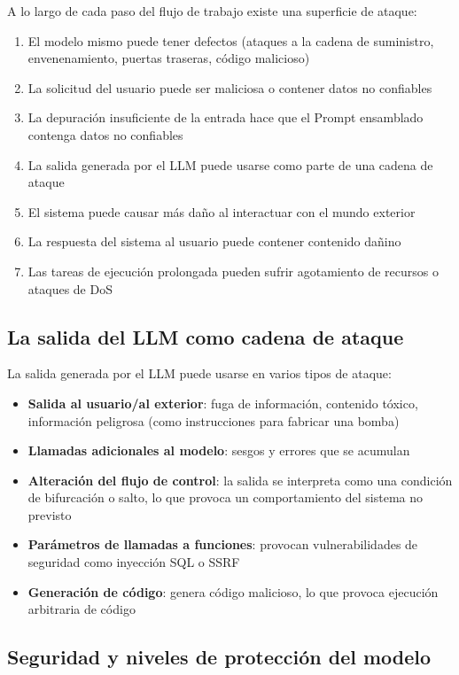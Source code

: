 \documentclass[a4paper]{article}
\begin{document}
A lo largo de cada paso del flujo de trabajo existe una superficie de ataque:
\begin{enumerate}
    \item El modelo mismo puede tener defectos (ataques a la cadena de suministro, envenenamiento, puertas traseras, código malicioso)
    \item La solicitud del usuario puede ser maliciosa o contener datos no confiables
    \item La depuración insuficiente de la entrada hace que el Prompt ensamblado contenga datos no confiables
    \item La salida generada por el LLM puede usarse como parte de una cadena de ataque
    \item El sistema puede causar más daño al interactuar con el mundo exterior
    \item La respuesta del sistema al usuario puede contener contenido dañino
    \item Las tareas de ejecución prolongada pueden sufrir agotamiento de recursos o ataques de DoS
\end{enumerate}

\subsection{La salida del LLM como cadena de ataque}

La salida generada por el LLM puede usarse en varios tipos de ataque:
\begin{itemize}
    \item \textbf{Salida al usuario/al exterior}: fuga de información, contenido tóxico, información peligrosa (como instrucciones para fabricar una bomba)
    \item \textbf{Llamadas adicionales al modelo}: sesgos y errores que se acumulan
    \item \textbf{Alteración del flujo de control}: la salida se interpreta como una condición de bifurcación o salto, lo que provoca un comportamiento del sistema no previsto
    \item \textbf{Parámetros de llamadas a funciones}: provocan vulnerabilidades de seguridad como inyección SQL o SSRF
    \item \textbf{Generación de código}: genera código malicioso, lo que provoca ejecución arbitraria de código
\end{itemize}

\subsection{Seguridad y niveles de protección del modelo}
\end{document}
